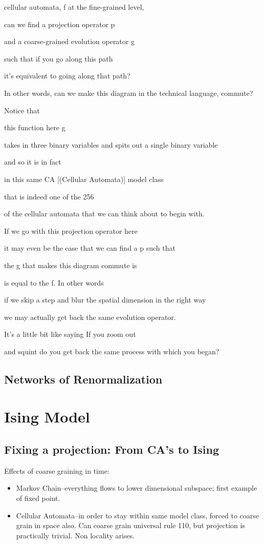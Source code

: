 \documentclass[]{article}
\begin{document}
cellular automata, f at the fine-grained level,

can we find a projection operator p

and a coarse-grained evolution operator g

such that if you go along this path

it's equivalent to going along that path?

In other words, can we make this diagram
in the technical language, commute?

Notice that

this function here g

takes in three binary variables and
spits out a single binary variable

and so it is in fact

in this same CA [(Cellular Automata)] model class

that is indeed one of the 256

of the cellular automata
that we can think about to begin with.

If we go with this projection
operator here

it may even be the case
that we can find a p such that

the g that makes this diagram commute is

is equal to the f. In other words

if we skip a step and blur
the spatial dimension in the right way

we may actually get back
the same evolution operator.

It's a little bit like saying
If you zoom out

and squint do you get back
the same process with which you began?
\subsection{Networks of Renormalization}

\cite{israeli2004computational,israeli2006coarse,dedeo2018origin}
\section{Ising Model}

\subsection{Fixing a projection: From CA’s to Ising}
Effects of coarse graining in time:
\begin{itemize}
	\item Markov Chain--everything flows to lower dimensional subspace; first example of fixed point.
	\item Cellular Automata--in order to stay within same model class, forced to coarse grain in space also. Can coarse grain universal rule 110, but projection is practically trivial. Non locality arises. 
\end{itemize}
\end{document}
